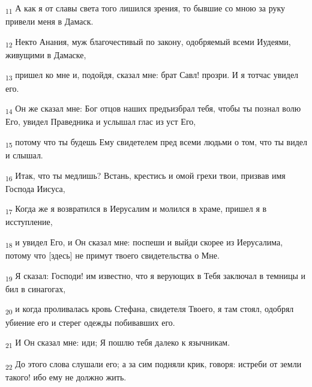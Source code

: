 \begin{tcolorbox}
\textsubscript{11} А как я от славы света того лишился зрения, то бывшие со мною за руку привели меня в Дамаск.
\end{tcolorbox}
\begin{tcolorbox}
\textsubscript{12} Некто Анания, муж благочестивый по закону, одобряемый всеми Иудеями, живущими в Дамаске,
\end{tcolorbox}
\begin{tcolorbox}
\textsubscript{13} пришел ко мне и, подойдя, сказал мне: брат Савл! прозри. И я тотчас увидел его.
\end{tcolorbox}
\begin{tcolorbox}
\textsubscript{14} Он же сказал мне: Бог отцов наших предъизбрал тебя, чтобы ты познал волю Его, увидел Праведника и услышал глас из уст Его,
\end{tcolorbox}
\begin{tcolorbox}
\textsubscript{15} потому что ты будешь Ему свидетелем пред всеми людьми о том, что ты видел и слышал.
\end{tcolorbox}
\begin{tcolorbox}
\textsubscript{16} Итак, что ты медлишь? Встань, крестись и омой грехи твои, призвав имя Господа Иисуса,
\end{tcolorbox}
\begin{tcolorbox}
\textsubscript{17} Когда же я возвратился в Иерусалим и молился в храме, пришел я в исступление,
\end{tcolorbox}
\begin{tcolorbox}
\textsubscript{18} и увидел Его, и Он сказал мне: поспеши и выйди скорее из Иерусалима, потому что [здесь] не примут твоего свидетельства о Мне.
\end{tcolorbox}
\begin{tcolorbox}
\textsubscript{19} Я сказал: Господи! им известно, что я верующих в Тебя заключал в темницы и бил в синагогах,
\end{tcolorbox}
\begin{tcolorbox}
\textsubscript{20} и когда проливалась кровь Стефана, свидетеля Твоего, я там стоял, одобрял убиение его и стерег одежды побивавших его.
\end{tcolorbox}
\begin{tcolorbox}
\textsubscript{21} И Он сказал мне: иди; Я пошлю тебя далеко к язычникам.
\end{tcolorbox}
\begin{tcolorbox}
\textsubscript{22} До этого слова слушали его; а за сим подняли крик, говоря: истреби от земли такого! ибо ему не должно жить.
\end{tcolorbox}
